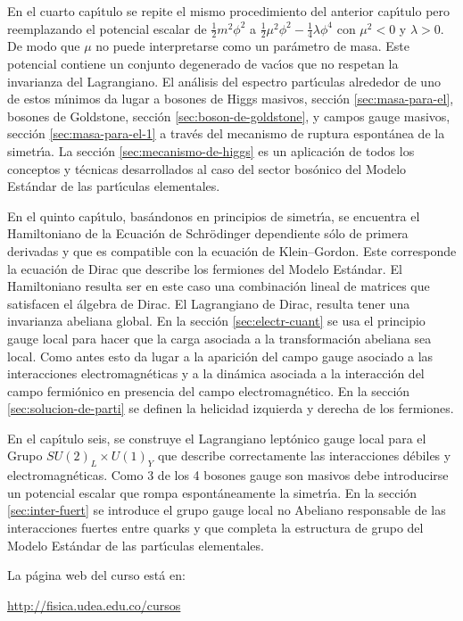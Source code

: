 En el cuarto cap\'\i tulo se repite el mismo procedimiento del anterior cap\'\i tulo pero reemplazando el potencial escalar de $\frac{1}{2}m^2\phi^2$ a $\frac{1}{2}\mu^2\phi^2-\frac{1}{4}\lambda\phi^4$ con $\mu^2\lt 0$ y $\lambda\gt 0$. De modo que $\mu$ no puede interpretarse como un par\'ametro de masa. Este potencial contiene un conjunto degenerado de vac\'\i os que no respetan la invarianza del Lagrangiano. El an\'alisis del espectro part\'\i culas alrededor de uno de estos m\'\i nimos da lugar a bosones de Higgs masivos, secci\'on \ref{sec:masa-para-el}, bosones de Goldstone, secci\'on \ref{sec:boson-de-goldstone}, y campos gauge masivos, secci\'on \ref{sec:masa-para-el-1} a trav\'es del mecanismo de ruptura espont\'anea de la simetr\'\i a. La secci\'on \ref{sec:mecanismo-de-higgs} es un aplicaci\'on de todos los conceptos y t\'ecnicas desarrollados al caso del sector bos\'onico del Modelo Est\'andar de las part\'\i culas elementales. 

En el quinto cap\'\i tulo, bas\'andonos en principios de simetr\'\i a, se encuentra el Hamiltoniano de la Ecuaci\'on de Schr\"odinger dependiente s\'olo de primera derivadas y que es compatible con la ecuaci\'on de Klein--Gordon. Este corresponde la ecuaci\'on de Dirac que describe los fermiones del Modelo Est\'andar. El Hamiltoniano resulta ser en este caso una combinaci\'on lineal de matrices que satisfacen el \'algebra de Dirac. El Lagrangiano de Dirac, resulta tener una invarianza abeliana global. En la secci\'on \ref{sec:electr-cuant} se usa el principio gauge local para hacer que la carga asociada a la transformaci\'on abeliana sea local. Como antes  esto da lugar a la aparici\'on del campo gauge asociado a las interacciones electromagn\'eticas y a la din\'amica asociada a la interacci\'on del campo fermi\'onico  en presencia del campo electromagn\'etico. En la secci\'on \ref{sec:solucion-de-parti} se definen la helicidad izquierda y derecha de los fermiones.

En el cap\'\i tulo seis, se construye el Lagrangiano lept\'onico gauge local para el Grupo $SU(2)_L\times U(1)_Y$ que describe correctamente las interacciones d\'ebiles y electromagn\'eticas. Como 3 de los 4 bosones gauge son masivos debe introducirse un potencial escalar que rompa espont\'aneamente la simetr\'\i a. En la secci\'on \ref{sec:inter-fuert} se introduce el grupo gauge local no Abeliano responsable de las interacciones fuertes entre quarks y que completa la estructura de grupo del Modelo Est\'andar de las part\'\i culas elementales. 

La p\'agina web del curso est\'a en:

\url{http://fisica.udea.edu.co/cursos}%





